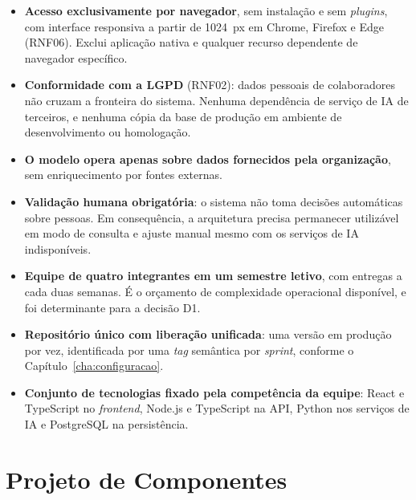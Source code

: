 \documentclass[a4paper,12pt,oneside,openany]{book}
\newif\iforientacoes
\newcommand{\orientacao}[1]{%
    \iforientacoes
        \begin{quote}
        \small\itshape\textbf{Orientação:} #1
        \end{quote}
    \fi
}
\begin{document}
\begin{itemize}[nosep]
    \item \textbf{Acesso exclusivamente por navegador}, sem instalação e sem
    \textit{plugins}, com interface responsiva a partir de 1024~px em Chrome,
    Firefox e Edge (RNF06). Exclui aplicação nativa e qualquer recurso
    dependente de navegador específico.
    \item \textbf{Conformidade com a LGPD} (RNF02): dados pessoais de
    colaboradores não cruzam a fronteira do sistema. Nenhuma dependência de
    serviço de IA de terceiros, e nenhuma cópia da base de produção em
    ambiente de desenvolvimento ou homologação.
    \item \textbf{O modelo opera apenas sobre dados fornecidos pela
    organização}, sem enriquecimento por fontes externas.
    \item \textbf{Validação humana obrigatória}: o sistema não toma decisões
    automáticas sobre pessoas. Em consequência, a arquitetura precisa
    permanecer utilizável em modo de consulta e ajuste manual mesmo com os
    serviços de IA indisponíveis.
    \item \textbf{Equipe de quatro integrantes em um semestre letivo}, com
    entregas a cada duas semanas. É o orçamento de complexidade operacional
    disponível, e foi determinante para a decisão D1.
    \item \textbf{Repositório único com liberação unificada}: uma versão em
    produção por vez, identificada por uma \textit{tag} semântica por
    \textit{sprint}, conforme o Capítulo~\ref{cha:configuracao}.
    \item \textbf{Conjunto de tecnologias fixado pela competência da equipe}:
    React e TypeScript no \textit{frontend}, Node.js e TypeScript na API,
    Python nos serviços de IA e PostgreSQL na persistência.
\end{itemize}

\chapter{Projeto de Componentes}\label{cha:componentes}

\orientacao{Detalhem a organização interna das partes mais relevantes do
sistema. O projeto de componentes pode ser representado graficamente,
textualmente ou por tabelas, de acordo com a natureza da solução.}
\end{document}
